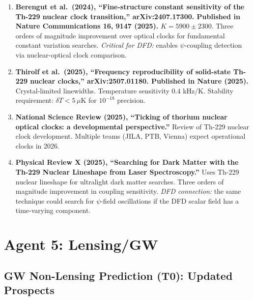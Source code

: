\documentclass[11pt]{article}
\begin{document}
\begin{tcolorbox}[colback=green!5!white, colframe=green!50!black,
  title=\textbf{Agent 3: NEW LITERATURE REVIEWED}]

\begin{enumerate}

\item \textbf{Berengut et al.\ (2024), ``Fine-structure constant
  sensitivity of the Th-229 nuclear clock transition,''
  arXiv:2407.17300. Published in Nature Communications 16, 9147 (2025).}
  $K = 5900 \pm 2300$. Three orders of magnitude improvement over
  optical clocks for fundamental constant variation searches.
  \emph{Critical for DFD:} enables $\psi$-coupling detection via
  nuclear-optical clock comparison.

\item \textbf{Thirolf et al.\ (2025), ``Frequency reproducibility of
  solid-state Th-229 nuclear clocks,'' arXiv:2507.01180. Published in
  Nature (2025).}
  Crystal-limited linewidths. Temperature sensitivity $0.4$ kHz/K.
  Stability requirement: $\delta T < 5\,\mu$K for $10^{-18}$
  precision.

\item \textbf{National Science Review (2025), ``Ticking of thorium
  nuclear optical clocks: a developmental perspective.''}
  Review of Th-229 nuclear clock development. Multiple teams (JILA,
  PTB, Vienna) expect operational clocks in 2026.

\item \textbf{Physical Review X (2025), ``Searching for Dark Matter
  with the Th-229 Nuclear Lineshape from Laser Spectroscopy.''}
  Uses Th-229 nuclear lineshape for ultralight dark matter searches.
  Three orders of magnitude improvement in coupling sensitivity.
  \emph{DFD connection:} the same technique could search for
  $\psi$-field oscillations if the DFD scalar field has a
  time-varying component.

\end{enumerate}
\end{tcolorbox}


\section{Agent 5: Lensing/GW}

\subsection{GW Non-Lensing Prediction (T0): Updated Prospects}
\end{document}
